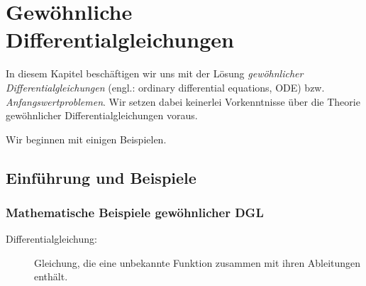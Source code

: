 \documentclass[
]{mycourse}
\theoremstyle{mythm}
\theoremstyle{break}
\begin{document}

\chapter[Gewöhnliche Differentialgleichungen]{Gewöhnliche Differentialgleichungen}

In diesem Kapitel beschäftigen wir uns mit der Lösung \emph{gewöhnlicher Differentialgleichungen} (engl.: ordinary differential equations, ODE) 
bzw. \emph{Anfangswertproblemen}. Wir setzen dabei keinerlei Vorkenntnisse über die Theorie gewöhnlicher Differentialgleichungen voraus.

Wir beginnen mit einigen Beispielen.

\section{Einführung und Beispiele}\label{sect:ODE_intro}

\subsection{Mathematische Beispiele gewöhnlicher DGL}

\begin{description}
\item[Differentialgleichung:] Gleichung, die eine unbekannte Funktion zusammen mit ihren Ableitungen enthält.
\end{description}
\end{document}

